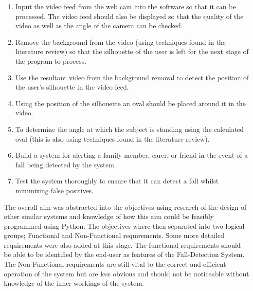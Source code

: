 \documentclass[11pt,a4paper]{report}
\begin{document}
\begin{enumerate}
	\item Input the video feed from the web cam into the software so that it can be processed. The video feed should also be displayed so that the quality of the video as well as the angle of the camera can be checked.
    \item Remove the background from the video (using techniques found in the literature review) so that the silhouette of the user is left for the next stage of the program to process.
    \item Use the resultant video from the background removal to detect the position of the user’s silhouette in the video feed.
    \item Using the position of the silhouette an oval should be placed around it in the video.
    \item To determine the angle at which the subject is standing using the calculated oval (this is also using
techniques found in the literature review).
	\item Build a system for alerting a family member, carer, or friend in the event of a fall being detected by the
system.
	\item Test the system thoroughly to ensure that it can detect a fall whilst minimizing false positives.
\end{enumerate}
\noindent
The overall aim was abstracted into the objectives using research of the design of other similar systems and knowledge of how this aim could be feasibly programmed using Python. The objectives where then separated into two logical groups; Functional and Non-Functional requirements. Some more detailed requirements were also added at this stage. The functional requirements should be able to be identified by the end-user as features of the Fall-Detection System. The Non-Functional requirements are still vital to the correct and efficient operation of the system but are less obvious and should not be noticeable without knowledge of the inner workings of the system.   
\end{document}
